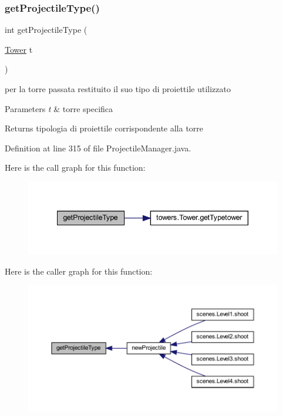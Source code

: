 \subsubsection{\texorpdfstring{get\+Projectile\+Type()}{getProjectileType()}}
{\footnotesize\ttfamily int get\+Projectile\+Type (\begin{DoxyParamCaption}\item[{\hyperlink{classtowers_1_1_tower}{Tower}}]{t }\end{DoxyParamCaption})}



per la torre passata restituito il suo tipo di proiettile utilizzato 


\begin{DoxyParams}{Parameters}
{\em t} & torre specifica\\
\hline
\end{DoxyParams}
\begin{DoxyReturn}{Returns}
tipologia di proiettile corrispondente alla torre 
\end{DoxyReturn}


Definition at line 315 of file Projectile\+Manager.\+java.

Here is the call graph for this function\+:\nopagebreak
\begin{figure}[H]
\begin{center}
\leavevmode
\includegraphics[width=342pt]{classmanagers_1_1_projectile_manager_a942d732bac65df2f0d220989ca42ce76_cgraph}
\end{center}
\end{figure}
Here is the caller graph for this function\+:\nopagebreak
\begin{figure}[H]
\begin{center}
\leavevmode
\includegraphics[width=350pt]{classmanagers_1_1_projectile_manager_a942d732bac65df2f0d220989ca42ce76_icgraph}
\end{center}
\end{figure}
\mbox{\label{classmanagers_1_1_projectile_manager_a78da03d9c5782fb25189cee3d4c78bfd}} 

